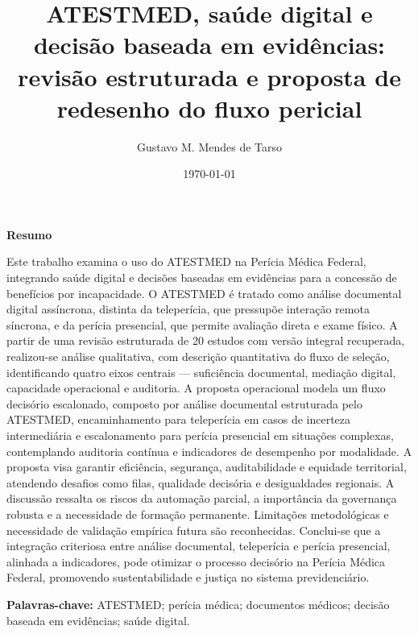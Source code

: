 \documentclass[12pt,a4paper]{article}
\author{Gustavo M. Mendes de Tarso}
\date{\today}
\title{ATESTMED, saúde digital e decisão baseada em evidências: revisão estruturada e proposta de redesenho do fluxo pericial}
\begin{document}
\makemytitle

\begingroup
\small
\begin{center}
\textbf{Resumo}
\end{center}
Este trabalho examina o uso do ATESTMED na Perícia Médica Federal, integrando saúde digital e decisões baseadas em evidências para a concessão de benefícios por incapacidade. O ATESTMED é tratado como análise documental digital assíncrona, distinta da teleperícia, que pressupõe interação remota síncrona, e da perícia presencial, que permite avaliação direta e exame físico. A partir de uma revisão estruturada de 20 estudos com versão integral recuperada, realizou-se análise qualitativa, com descrição quantitativa do fluxo de seleção, identificando quatro eixos centrais — suficiência documental, mediação digital, capacidade operacional e auditoria. A proposta operacional modela um fluxo decisório escalonado, composto por análise documental estruturada pelo ATESTMED, encaminhamento para teleperícia em casos de incerteza intermediária e escalonamento para perícia presencial em situações complexas, contemplando auditoria contínua e indicadores de desempenho por modalidade. A proposta visa garantir eficiência, segurança, auditabilidade e equidade territorial, atendendo desafios como filas, qualidade decisória e desigualdades regionais. A discussão ressalta os riscos da automação parcial, a importância da governança robusta e a necessidade de formação permanente. Limitações metodológicas e necessidade de validação empírica futura são reconhecidas. Conclui-se que a integração criteriosa entre análise documental, teleperícia e perícia presencial, alinhada a indicadores, pode otimizar o processo decisório na Perícia Médica Federal, promovendo sustentabilidade e justiça no sistema previdenciário.

\noindent\textbf{Palavras-chave:} ATESTMED; perícia médica; documentos médicos; decisão baseada em evidências; saúde digital.
\end{document}
